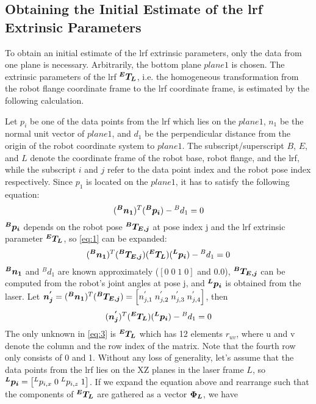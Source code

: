 \subsection{Obtaining the Initial Estimate of the \ac{lrf} Extrinsic Parameters}
\label{sec:first_step}
To obtain an initial estimate of the \ac{lrf} extrinsic parameters, only the data from one plane is necessary. Arbitrarily, the bottom plane $plane 1$ is chosen. The extrinsic parameters of the \ac{lrf} $\vb*{{^E}T_L}$, i.e. the homogeneous transformation from the robot flange coordinate frame to the \ac{lrf} coordinate frame, is estimated by the following calculation. 

Let $p_i$ be one of the data points from the \ac{lrf} which lies on the $plane 1$, $n_1$ be the normal unit vector of $plane 1$, and $d_1$ be the perpendicular distance from the origin of the robot coordinate system to $plane 1$. The subscript/superscript $B$, $E$, and $L$ denote the coordinate frame of the robot base, robot flange, and the \ac{lrf}, while the subscript $i$ and $j$ refer to the data point index and the robot pose index respectively. Since $p_1$ is located on the $plane 1$, it has to satisfy the following equation:
  \begin{equation}
  \label{eq:1}
  (\vb*{{^B}n_1}) ^T (\vb*{{^B}p_i}) - {^B}d_1 = 0
   \end{equation}
$\vb*{{^B}p_i}$ depends on the robot pose $\vb*{{^B}T_{E,j}}$ at pose index j and the \ac{lrf} extrinsic parameter $\vb*{{^E}T_L}$, so \eqref{eq:1}  can be expanded:
  \begin{equation}
  (\vb*{{^B}n_1}) ^T (\vb*{{^B}T_{E,j}}) (\vb*{{^E}T_L}) (\vb*{{^L}p_i}) - {^B}d_1 = 0
  \end{equation}
$\vb*{{^B}n_1}$ and $^{B}d_1$ are known approximately ($[0 \; 0\; 1\;0]$ and $0.0$), $\vb*{{^B}T_{E,j}}$ can be computed from the robot's joint angles at pose j, and $\vb*{{^L}p_i}$ is obtained from the laser. Let $\vb*{n^{'}_j} = (\vb*{{^B}n_1}) ^T (\vb*{{^B}T_{E,j}}) = 
\left[n^{'}_{j,1} \; n^{'}_{j,2} \; n^{'}_{j,3}  \; n^{'}_{j,4} \right]$, then  
  \begin{equation}
  \label{eq:3}
  (\vb*{n^{'}_j}) ^T (\vb*{{^E}T_L}) (\vb*{{^L}p_i}) - {^B}d_1 = 0
  \end{equation}
The only unknown in \eqref{eq:3} is $\vb*{{^E}T_L}$ which has 12 elements $r_{uv}$, where u and v denote the column and the row index of the matrix. Note that the fourth row only consists of 0 and 1. 
Without any loss of generality, let's assume that the data points from the \ac{lrf} lies on the XZ planes in the laser frame $L$, so $\vb*{{^L}p_i} = \left[{^L}p_{i,x} \; 0 \; {^L}p_{i,z}\; 1\right]$. If we expand the equation above and rearrange such that the components of $\vb*{{^E}T_L}$ are gathered as a vector $\vb*{\Phi_L}$, we have
